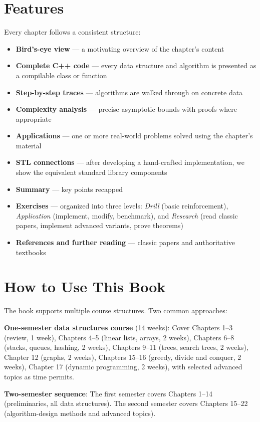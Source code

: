 \section{Features}

Every chapter follows a consistent structure:

\begin{itemize}
\item \textbf{Bird's-eye view} — a motivating overview of the chapter's content
\item \textbf{Complete C++ code} — every data structure and algorithm is presented as a compilable class or function
\item \textbf{Step-by-step traces} — algorithms are walked through on concrete data
\item \textbf{Complexity analysis} — precise asymptotic bounds with proofs where appropriate
\item \textbf{Applications} — one or more real-world problems solved using the chapter's material
\item \textbf{STL connections} — after developing a hand-crafted implementation, we show the equivalent standard library components
\item \textbf{Summary} — key points recapped
\item \textbf{Exercises} — organized into three levels: \textit{Drill} (basic reinforcement), \textit{Application} (implement, modify, benchmark), and \textit{Research} (read classic papers, implement advanced variants, prove theorems)
\item \textbf{References and further reading} — classic papers and authoritative textbooks
\end{itemize}

\section{How to Use This Book}

The book supports multiple course structures. Two common approaches:

\textbf{One-semester data structures course} (14 weeks): Cover Chapters 1–3 (review, 1 week), Chapters 4–5 (linear lists, arrays, 2 weeks), Chapters 6–8 (stacks, queues, hashing, 2 weeks), Chapters 9–11 (trees, search trees, 2 weeks), Chapter 12 (graphs, 2 weeks), Chapters 15–16 (greedy, divide and conquer, 2 weeks), Chapter 17 (dynamic programming, 2 weeks), with selected advanced topics as time permits.

\textbf{Two-semester sequence}: The first semester covers Chapters 1–14 (preliminaries, all data structures). The second semester covers Chapters 15–22 (algorithm-design methods and advanced topics).

